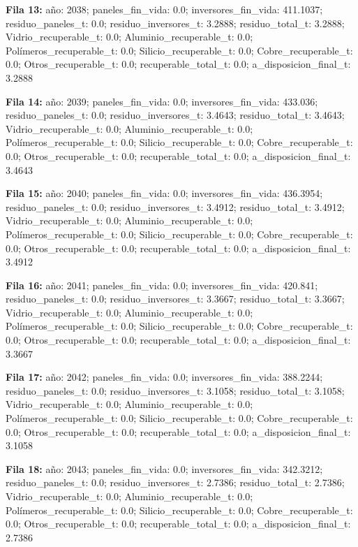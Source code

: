 {\footnotesize\textbf{Fila 13:} año: 2038; paneles\_fin\_vida: 0.0; inversores\_fin\_vida: 411.1037; residuo\_paneles\_t: 0.0; residuo\_inversores\_t: 3.2888; residuo\_total\_t: 3.2888; Vidrio\_recuperable\_t: 0.0; Aluminio\_recuperable\_t: 0.0; Polímeros\_recuperable\_t: 0.0; Silicio\_recuperable\_t: 0.0; Cobre\_recuperable\_t: 0.0; Otros\_recuperable\_t: 0.0; recuperable\_total\_t: 0.0; a\_disposicion\_final\_t: 3.2888\par}
{\footnotesize\textbf{Fila 14:} año: 2039; paneles\_fin\_vida: 0.0; inversores\_fin\_vida: 433.036; residuo\_paneles\_t: 0.0; residuo\_inversores\_t: 3.4643; residuo\_total\_t: 3.4643; Vidrio\_recuperable\_t: 0.0; Aluminio\_recuperable\_t: 0.0; Polímeros\_recuperable\_t: 0.0; Silicio\_recuperable\_t: 0.0; Cobre\_recuperable\_t: 0.0; Otros\_recuperable\_t: 0.0; recuperable\_total\_t: 0.0; a\_disposicion\_final\_t: 3.4643\par}
{\footnotesize\textbf{Fila 15:} año: 2040; paneles\_fin\_vida: 0.0; inversores\_fin\_vida: 436.3954; residuo\_paneles\_t: 0.0; residuo\_inversores\_t: 3.4912; residuo\_total\_t: 3.4912; Vidrio\_recuperable\_t: 0.0; Aluminio\_recuperable\_t: 0.0; Polímeros\_recuperable\_t: 0.0; Silicio\_recuperable\_t: 0.0; Cobre\_recuperable\_t: 0.0; Otros\_recuperable\_t: 0.0; recuperable\_total\_t: 0.0; a\_disposicion\_final\_t: 3.4912\par}
{\footnotesize\textbf{Fila 16:} año: 2041; paneles\_fin\_vida: 0.0; inversores\_fin\_vida: 420.841; residuo\_paneles\_t: 0.0; residuo\_inversores\_t: 3.3667; residuo\_total\_t: 3.3667; Vidrio\_recuperable\_t: 0.0; Aluminio\_recuperable\_t: 0.0; Polímeros\_recuperable\_t: 0.0; Silicio\_recuperable\_t: 0.0; Cobre\_recuperable\_t: 0.0; Otros\_recuperable\_t: 0.0; recuperable\_total\_t: 0.0; a\_disposicion\_final\_t: 3.3667\par}
{\footnotesize\textbf{Fila 17:} año: 2042; paneles\_fin\_vida: 0.0; inversores\_fin\_vida: 388.2244; residuo\_paneles\_t: 0.0; residuo\_inversores\_t: 3.1058; residuo\_total\_t: 3.1058; Vidrio\_recuperable\_t: 0.0; Aluminio\_recuperable\_t: 0.0; Polímeros\_recuperable\_t: 0.0; Silicio\_recuperable\_t: 0.0; Cobre\_recuperable\_t: 0.0; Otros\_recuperable\_t: 0.0; recuperable\_total\_t: 0.0; a\_disposicion\_final\_t: 3.1058\par}
{\footnotesize\textbf{Fila 18:} año: 2043; paneles\_fin\_vida: 0.0; inversores\_fin\_vida: 342.3212; residuo\_paneles\_t: 0.0; residuo\_inversores\_t: 2.7386; residuo\_total\_t: 2.7386; Vidrio\_recuperable\_t: 0.0; Aluminio\_recuperable\_t: 0.0; Polímeros\_recuperable\_t: 0.0; Silicio\_recuperable\_t: 0.0; Cobre\_recuperable\_t: 0.0; Otros\_recuperable\_t: 0.0; recuperable\_total\_t: 0.0; a\_disposicion\_final\_t: 2.7386\par}
